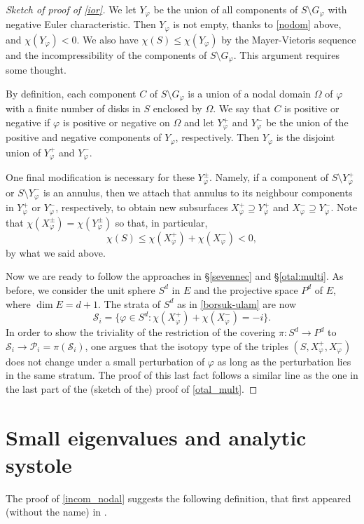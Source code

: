 \documentclass[a4paper,11pt]{amsart}
\numberwithin{equation}{section}
\theoremstyle{definition}
\def\vf{\varphi}
\begin{document}
\begin{proof}[Sketch of proof of \cref{ior}]
We let $Y_\vf$ be the union of all components of $S\setminus G_\vf$ with negative Euler characteristic.
Then $Y_\vf$ is not empty, thanks to \cref{nodom} above, and $\chi(Y_\vf)<0$.
We also have $\chi(S)\le\chi(Y_\vf)$ by the Mayer-Vietoris sequence and the incompressibility of the components of $S\setminus G_\vf$.
This argument requires some thought.

By definition, each component $C$ of $S\setminus G_\vf$ is a union of a nodal domain $\Omega$ of $\vf$ with a finite number of disks in $S$ enclosed by $\Omega$.
We say that $C$ is positive or negative if $\vf$ is positive or negative on $\Omega$
and let $Y^+_\vf$ and $Y^-_\vf$ be the union of the positive and negative components of $Y_\vf$, respectively.
Then $Y_\vf$ is the disjoint union of $Y^+_\vf$ and $Y^-_\vf$.

One final modification is necessary for these $Y^\pm_\varphi$.
Namely, if a component of $S\setminus Y^+_\varphi$ or $S \setminus Y^-_\varphi$ is an annulus,
then we attach that annulus to its neighbour components in $Y^+_\varphi$ or $Y^-_\varphi$, respectively,
to obtain new subsurfaces $X^+_\varphi\supseteq Y^+_\varphi$ and $X^-_\varphi\supseteq Y^-_\varphi$. 
Note that $\chi(X^\pm_\varphi)=\chi(Y^\pm_\varphi)$ so that, in particular,
\begin{equation*}
  \chi(S) \le \chi(X^+_\varphi) + \chi(X^-_\varphi) <0,
\end{equation*}
by what we said above.

Now we are ready to follow the approaches in \S \ref{sevennec} and \S \ref{otal:multi}.
As before, we consider the unit sphere $S^d$ in $E$ and the projective space $P^d$ of $E$,
where $\dim E = d+1$.
The strata of $S^d$ as in \cref{borsuk-ulam} are now 
\begin{equation*}
\mathcal{S}_i = \{ \vf \in S^d: \chi(X^+_\varphi) + \chi(X^-_\varphi) = -i \}.
\end{equation*}
In order to show the triviality of the restriction of the covering $\pi\colon S^d\to P^d$ to $\mathcal{S}_i \to \mathcal{P}_i=\pi(\mathcal{S}_i)$,
one argues that the isotopy type of the triples $(S, X^+_\varphi, X^-_\varphi)$ does not change under a small perturbation of $\varphi$ as long as the perturbation lies in the same stratum. 
The proof of this last fact follows a similar line as the one in the last part of the (sketch of the) proof of \cref{otal_mult}.
\end{proof}

\section{Small eigenvalues and analytic systole}
\label{secas}
The proof of \cref{incom_nodal} suggests the following definition, that first appeared (without the name) in \cite[cf.\,Equation 1.6]{BMM1}.
\end{document}
